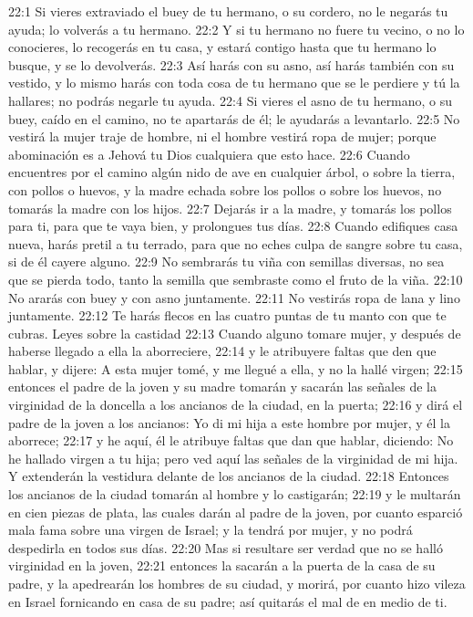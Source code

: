 22:1 Si vieres extraviado el buey de tu hermano, o su cordero, no le negarás tu ayuda; lo volverás a tu hermano.  
22:2 Y si tu hermano no fuere tu vecino, o no lo conocieres, lo recogerás en tu casa, y estará contigo hasta que tu hermano lo busque, y se lo devolverás.  
22:3 Así harás con su asno, así harás también con su vestido, y lo mismo harás con toda cosa de tu hermano que se le perdiere y tú la hallares; no podrás negarle tu ayuda.  
22:4 Si vieres el asno de tu hermano, o su buey, caído en el camino, no te apartarás de él; le ayudarás a levantarlo. 
22:5 No vestirá la mujer traje de hombre, ni el hombre vestirá ropa de mujer; porque abominación es a Jehová tu Dios cualquiera que esto hace.  
22:6 Cuando encuentres por el camino algún nido de ave en cualquier árbol, o sobre la tierra, con pollos o huevos, y la madre echada sobre los pollos o sobre los huevos, no tomarás la madre con los hijos.  
22:7 Dejarás ir a la madre, y tomarás los pollos para ti, para que te vaya bien, y prolongues tus días.  
22:8 Cuando edifiques casa nueva, harás pretil a tu terrado, para que no eches culpa de sangre sobre tu casa, si de él cayere alguno.  
22:9 No sembrarás tu viña con semillas diversas, no sea que se pierda todo, tanto la semilla que sembraste como el fruto de la viña.  
22:10 No ararás con buey y con asno juntamente.  
22:11 No vestirás ropa de lana y lino juntamente. 
22:12 Te harás flecos en las cuatro puntas de tu manto con que te cubras. 
Leyes sobre la castidad  
22:13 Cuando alguno tomare mujer, y después de haberse llegado a ella la aborreciere,  
22:14 y le atribuyere faltas que den que hablar, y dijere: A esta mujer tomé, y me llegué a ella, y no la hallé virgen;  
22:15 entonces el padre de la joven y su madre tomarán y sacarán las señales de la virginidad de la doncella a los ancianos de la ciudad, en la puerta;  
22:16 y dirá el padre de la joven a los ancianos: Yo di mi hija a este hombre por mujer, y él la aborrece;  
22:17 y he aquí, él le atribuye faltas que dan que hablar, diciendo: No he hallado virgen a tu hija; pero ved aquí las señales de la virginidad de mi hija. Y extenderán la vestidura delante de los ancianos de la ciudad.  
22:18 Entonces los ancianos de la ciudad tomarán al hombre y lo castigarán;  
22:19 y le multarán en cien piezas de plata, las cuales darán al padre de la joven, por cuanto esparció mala fama sobre una virgen de Israel; y la tendrá por mujer, y no podrá despedirla en todos sus días.  
22:20 Mas si resultare ser verdad que no se halló virginidad en la joven,  
22:21 entonces la sacarán a la puerta de la casa de su padre, y la apedrearán los hombres de su ciudad, y morirá, por cuanto hizo vileza en Israel fornicando en casa de su padre; así quitarás el mal de en medio de ti.  
